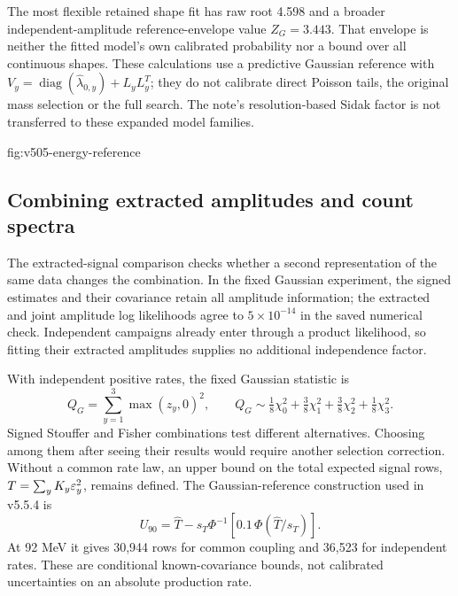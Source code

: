 The most flexible retained shape fit has raw root 4.598 and a broader
independent-amplitude reference-envelope value $Z_G=3.443$. That envelope
is neither the fitted model's own calibrated probability nor a bound over
all continuous shapes. These calculations use a predictive Gaussian
reference with $V_y=\operatorname{diag}(\widehat\lambda_{0,y})+L_yL_y^T$;
they do not calibrate direct Poisson tails, the original mass selection or
the full search. The note's resolution-based Sidak factor is not transferred
to these expanded model families.

{fig:v505-energy-reference}

\subsection{Combining extracted amplitudes and count spectra}
The extracted-signal comparison checks whether a second representation of
the same data changes the combination. In the fixed Gaussian experiment,
the signed estimates and their covariance retain all amplitude information;
the extracted and joint amplitude log likelihoods agree to
$5\times10^{-14}$ in the saved numerical check. Independent campaigns
already enter through a product likelihood, so fitting their extracted
amplitudes supplies no additional independence factor.

With independent positive rates, the fixed Gaussian statistic is
\begin{equation}
 Q_G=\sum_{y=1}^3\max(z_y,0)^2,\qquad
 Q_G\sim\tfrac18\chi_0^2+\tfrac38\chi_1^2+
          \tfrac38\chi_2^2+\tfrac18\chi_3^2.
\end{equation}
Signed Stouffer and Fisher combinations test different alternatives. Choosing
among them after seeing their results would require another selection
correction. Without a common rate law, an upper bound on the total expected
signal rows, $T=\sum_yK_y\varepsilon_y^2$, remains defined. The Gaussian-reference
construction used in v5.5.4 is
\begin{equation}
 U_{90}=\widehat T-s_T\Phi^{-1}
 \left[0.1\,\Phi(\widehat T/s_T)\right].
\end{equation}
At 92 MeV it gives 30,944 rows for common coupling and 36,523 for independent
rates. These are conditional known-covariance bounds, not calibrated
uncertainties on an absolute production rate.

